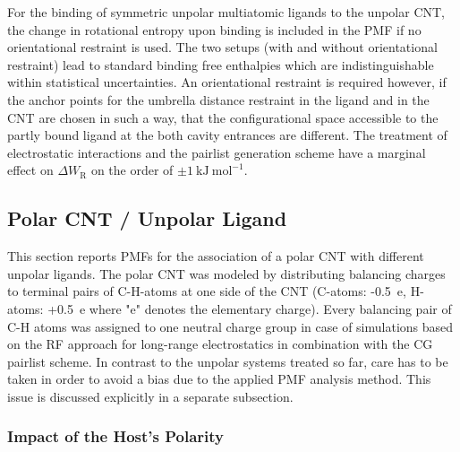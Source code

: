 \documentclass[9pt,lessons,pubversion]{livecoms}
\begin{document}
For the binding of symmetric unpolar multiatomic ligands to the unpolar CNT, the change in rotational entropy upon binding is included in the PMF if no orientational restraint is used.
The two setups (with and without orientational restraint) lead to standard binding free enthalpies which are indistinguishable within statistical uncertainties.
An orientational restraint is required however, if the anchor points for the umbrella distance restraint in the ligand and in the CNT are chosen in such a way, 
that the configurational space accessible to the partly bound ligand at the both cavity entrances are different. 
The treatment of electrostatic interactions and the pairlist generation scheme have a marginal effect on $\Delta W_\mathrm{R}$ on the order of $\pm 1~\mathrm{kJ}~\mathrm{mol}^{-1}$.

\subsection{Polar CNT / Unpolar Ligand}
\label{subsec:pol_host_unp_lig}

This section reports PMFs for the association of a polar CNT with different unpolar ligands.
The polar CNT was modeled by distributing balancing charges to terminal pairs of C-H-atoms at one side of the CNT (C-atoms: -0.5~e, H-atoms: +0.5~e where "e" denotes the elementary charge).
Every balancing pair of C-H atoms was assigned to one neutral charge group in case of simulations based on the RF approach for long-range electrostatics in combination with the CG pairlist scheme.
In contrast to the unpolar systems treated so far, care has to be taken in order to avoid a bias due to the applied PMF analysis method. 
This issue is discussed explicitly in a separate subsection. 

\subsubsection*{Impact of the Host's Polarity}
\end{document}
